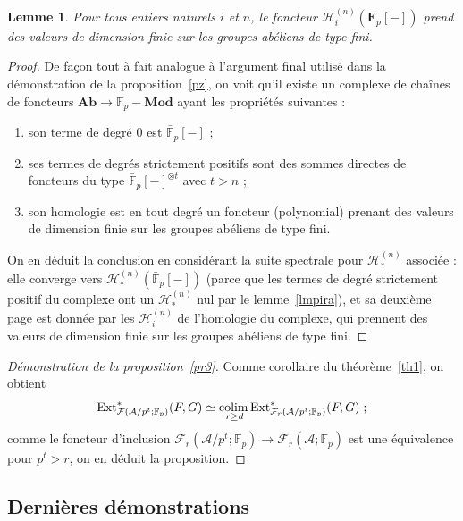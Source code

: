 \documentclass[a4paper,10pt]{article}
\newcommand{\A}{{\mathcal{A}}}
\newcommand{\F}{{\mathcal{F}}}
\newcommand{\Hh}{{\mathcal{H}}}
\newcommand{\col}{{\rm colim}\,}
\newtheorem{lm}[thm]{Lemme}
\theoremstyle{definition}
\theoremstyle{remark}
\begin{document}
\begin{lm}\label{lmf2}
  Pour tous entiers naturels $i$ et $n$, le foncteur $\Hh^{(n)}_i(\mathbf{F}_p[-])$ prend des valeurs de dimension finie sur les groupes abéliens de type fini.
\end{lm}

\begin{proof}
De façon tout à fait analogue à l'argument final utilisé dans la démonstration de la proposition~\ref{pz}, on voit qu'il existe un complexe de chaînes de foncteurs $\mathbf{Ab}\to\mathbb{F}_p-\mathbf{Mod}$ ayant les propriétés suivantes :
\begin{enumerate}
 \item son terme de degré $0$ est $\bar{\mathbb{F}}_p[-]$ ;
\item ses termes de degrés strictement positifs sont des sommes directes de foncteurs du type $\bar{\mathbb{F}}_p[-]^{\otimes t}$ avec $t>n$ ;
\item son homologie est en tout degré un foncteur (polynomial) prenant des valeurs de dimension finie sur les groupes abéliens de type fini. 
\end{enumerate}
On en déduit la conclusion en considérant la suite spectrale pour $\Hh^{(n)}_*$ associée : elle converge vers $\Hh^{(n)}_*(\bar{\mathbb{F}}_p[-])$ (parce que les termes de degré strictement positif du complexe ont un $\Hh^{(n)}_*$ nul par le lemme~\ref{lmpira}), et sa deuxième page est donnée par les $\Hh^{(n)}_i$ de l'homologie du complexe, qui prennent des valeurs de dimension finie sur les groupes abéliens de type fini.
\end{proof}


\begin{proof}[Démonstration de la proposition~\ref{pr3}]
 Comme corollaire du théorème~\ref{th1}, on obtient
$${\rm Ext}^*_{\F(\A/p^t;\mathbb{F}_p)}(F,G)\simeq\underset{r\geq d}{\col}{\rm Ext}^*_{\F_r(\A/p^t;\mathbb{F}_p)}(F,G)\;;$$
comme le foncteur d'inclusion $\F_r(\A/p^t;\mathbb{F}_p)\to\F_r(\A;\mathbb{F}_p)$ est une équivalence pour $p^t>r$, on en déduit la proposition.
\end{proof}

\subsection{Dernières démonstrations}
\end{document}
